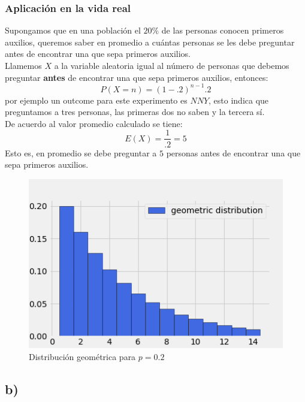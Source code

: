 \documentclass{article}
\begin{document}
\begin{tcolorbox}[breakable]
    \subsubsection*{Aplicación en la vida real}
    Supongamos que en una población el $20\%$ de las personas conocen primeros auxilios,
    queremos saber en promedio a cuántas personas se les debe preguntar 
    antes de encontrar una que sepa primeros auxilios. \\
    Llamemos $X$ a la variable aleatoria igual al número de personas que debemos preguntar
    \textbf{antes} de encontrar una que sepa primeros auxilios, entonces:
    \[ P(X=n) = (1-.2)^{n-1}.2 \]
    por ejemplo un outcome para este experimento es $NNY$, esto indica que preguntamos a tres personas, 
    las primeras dos no saben y la tercera sí. \\
    De acuerdo al valor promedio calculado se tiene:
    \[E(X) = \frac{1}{.2} = 5\]
    Esto es, en promedio se debe preguntar a $5$ personas antes de encontrar una que sepa primeros auxilios.
    \begin{figure}[H]
        \centering
        \includegraphics[scale=0.7]{images/p7_geometric.png}
        \caption{Distribución geométrica para $p=0.2$}
    \end{figure}
    \subsection*{b)}

\end{tcolorbox}
\end{document}
